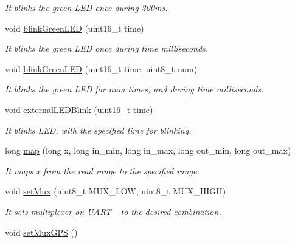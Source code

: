 \begin{DoxyCompactItemize}
\begin{DoxyCompactList}\small\item\em It blinks the green L\+ED once during 200ms. \end{DoxyCompactList}\item 
void \hyperlink{class_wasp_utils_a4926e9950d8547f06e3caec7bbcdedc1}{blink\+Green\+L\+ED} (uint16\+\_\+t time)
\begin{DoxyCompactList}\small\item\em It blinks the green L\+ED once during \textquotesingle{}time\textquotesingle{} milliseconds. \end{DoxyCompactList}\item 
void \hyperlink{class_wasp_utils_ab0f095d4758080bd343b5bec19f7a146}{blink\+Green\+L\+ED} (uint16\+\_\+t time, uint8\+\_\+t num)
\begin{DoxyCompactList}\small\item\em It blinks the green L\+ED for \textquotesingle{}num\textquotesingle{} times, and during \textquotesingle{}time\textquotesingle{} milliseconds. \end{DoxyCompactList}\item 
void \hyperlink{class_wasp_utils_a71b72648b5e6651acd9fc9a6861165d4}{external\+L\+E\+D\+Blink} (uint16\+\_\+t time)
\begin{DoxyCompactList}\small\item\em It blinks L\+ED, with the specified time for blinking. \end{DoxyCompactList}\item 
long \hyperlink{class_wasp_utils_ab13704522d07743ba6b33b3900ecf19a}{map} (long x, long in\+\_\+min, long in\+\_\+max, long out\+\_\+min, long out\+\_\+max)
\begin{DoxyCompactList}\small\item\em It maps \textquotesingle{}x\textquotesingle{} from the read range to the specified range. \end{DoxyCompactList}\item 
void \hyperlink{class_wasp_utils_a0735336840a185faca20c356847591a8}{set\+Mux} (uint8\+\_\+t M\+U\+X\+\_\+\+L\+OW, uint8\+\_\+t M\+U\+X\+\_\+\+H\+I\+GH)
\begin{DoxyCompactList}\small\item\em It sets multiplexer on U\+A\+R\+T\+\_ to the desired combination. \end{DoxyCompactList}\item 
void \hyperlink{class_wasp_utils_a5ac44b9711e046e5f68140e76bb00667}{set\+Mux\+G\+PS} ()

\end{DoxyCompactItemize}
